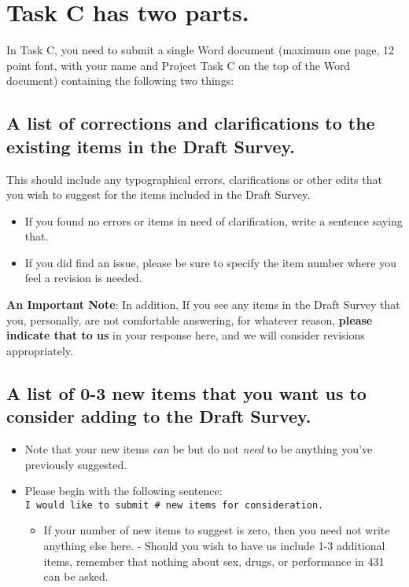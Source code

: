 \documentclass[]{book}
\providecommand{\tightlist}{%
  \setlength{\itemsep}{0pt}\setlength{\parskip}{0pt}}
\theoremstyle{definition}
\theoremstyle{definition}
\theoremstyle{definition}
\theoremstyle{remark}
\begin{document}
\hypertarget{task-c-has-two-parts.}{%
\section{Task C has two parts.}\label{task-c-has-two-parts.}}

In Task C, you need to submit a single Word document (maximum one page,
12 point font, with your name and Project Task C on the top of the Word
document) containing the following two things:

\hypertarget{a-list-of-corrections-and-clarifications-to-the-existing-items-in-the-draft-survey.}{%
\subsection{A list of corrections and clarifications to the existing
items in the Draft
Survey.}\label{a-list-of-corrections-and-clarifications-to-the-existing-items-in-the-draft-survey.}}

This should include any typographical errors, clarifications or other
edits that you wish to suggest for the items included in the Draft
Survey.

\begin{itemize}
\tightlist
\item
  If you found no errors or items in need of clarification, write a
  sentence saying that.
\item
  If you did find an issue, please be sure to specify the item number
  where you feel a revision is needed.
\end{itemize}

\textbf{An Important Note}: In addition, If you see any items in the
Draft Survey that you, personally, are not comfortable answering, for
whatever reason, \textbf{please indicate that to us} in your response
here, and we will consider revisions appropriately.

\hypertarget{a-list-of-0-3-new-items-that-you-want-us-to-consider-adding-to-the-draft-survey.}{%
\subsection{A list of 0-3 new items that you want us to consider adding
to the Draft
Survey.}\label{a-list-of-0-3-new-items-that-you-want-us-to-consider-adding-to-the-draft-survey.}}

\begin{itemize}
\tightlist
\item
  Note that your new items \emph{can} be but do not \emph{need} to be
  anything you've previously suggested.
\item
  Please begin with the following sentence:
  \texttt{I\ would\ like\ to\ submit\ \#\ new\ items\ for\ consideration.}

  \begin{itemize}
  \tightlist
  \item
    If your number of new items to suggest is zero, then you need not
    write anything else here. - Should you wish to have us include 1-3
    additional items, remember that nothing about sex, drugs, or
    performance in 431 can be asked.
  \end{itemize}
\end{itemize}
\end{document}
